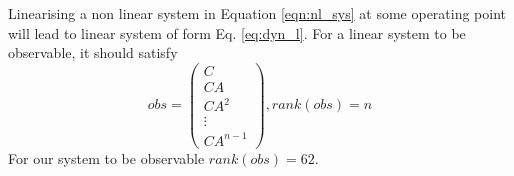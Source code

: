 Linearising a non linear system in Equation \ref{eqn:nl_sys} at some operating point will lead to linear system of form Eq. \ref{eq:dyn_l}. For a linear system to be observable, it should satisfy
\begin{equation}
obs =
\begin{pmatrix}
C\\ CA \\ CA^{2}\\ \vdots \\ CA^{n-1}
\end{pmatrix}
, rank(obs) =n
\end{equation}
For our system to be observable $rank(obs) = 62$.
	
%
